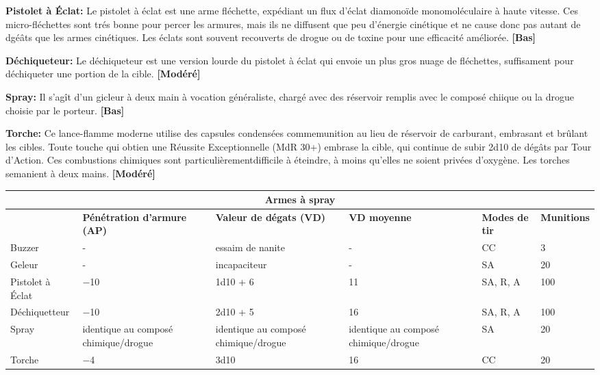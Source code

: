 \textbf{Pistolet à  Éclat:} Le pistolet à éclat est une arme fléchette, expédiant un flux d'éclat diamonoïde monomoléculaire à haute vitesse. Ces micro-fléchettes sont trés bonne pour percer les armures, mais ils ne diffusent que peu d'énergie cinétique et ne cause donc pas autant de dgéâts que les armes cinétiques. Les éclats sont souvent recouverts de drogue ou de toxine pour une efficacité améliorée. \textbf{[Bas]} 

\textbf{Déchiqueteur:} Le déchiqueteur est une version lourde du pistolet à éclat qui envoie un plus gros nuage de fléchettes, suffisament pour déchiqueter une portion de la cible. \textbf{[Modéré]} 

\textbf{Spray:} Il s'agît d'un gicleur à deux main à vocation généraliste, chargé avec des réservoir remplis avec le composé chiique ou la drogue choisie par le porteur. \textbf{[Bas]} 

\textbf{Torche:} Ce lance-flamme moderne utilise des capsules condensées commemunition au lieu de réservoir de carburant, embrasant et brûlant les cibles. Toute touche qui obtien une Réussite Exceptionnelle (MdR 30+) embrase la cible, qui continue de subir 2d10 de dégâts par Tour d'Action. Ces combustions chimiques sont particulièrementdifficile à éteindre, à moins qu'elles ne soient privées d'oxygène. Les torches semanient à deux mains. \textbf{[Modéré]} 

\begin{table} \begin{tabularx}{\textwidth}{|l|X|l|l|l|l|} \hline

\multicolumn{6}{|c|}{\textbf{Armes à spray}} \\ \hline

&\textbf{Pénétration d'armure (AP)}	&\textbf{Valeur de dégats (VD)}	&\textbf{VD moyenne}	&\textbf{Modes de tir}	&\textbf{Munitions} \\ \hline

Buzzer	&- &essaim de nanite	&- &CC	&3 \\ \hline

Geleur	&- &incapaciteur	&- &SA	&20 \\ \hline

Pistolet à Éclat	&$-$10	&1d10 + 6	&11	&SA, R, A	&100 \\ \hline

Déchiquetteur	&$-$10	&2d10 + 5	&16	&SA, R, A	&100 \\ \hline

Spray	&identique au composé chimique/drogue	&identique au composé chimique/drogue	&identique au composé chimique/drogue	&SA	&20 \\ \hline

Torche	&$-$4	&3d10	&16	&CC	&20 \\ \hline

\end{tabularx} \label{tab:spray-weapons} \end{table} 

